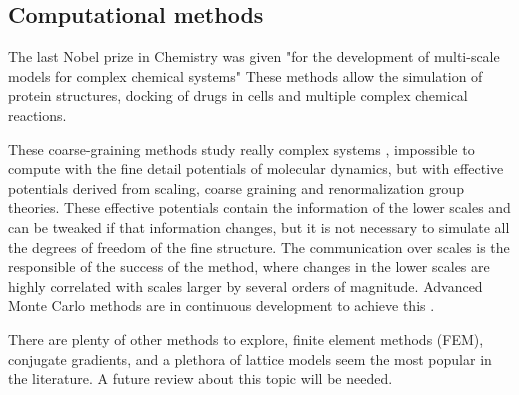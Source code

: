 \subsection{Computational methods}  
The last Nobel prize in Chemistry was given "for the development of multi-scale
models for complex chemical systems" \citep{nobel:chemistry2013} These methods
allow the simulation of protein structures,  docking of drugs in cells and
multiple complex chemical reactions.

These coarse-graining methods study really complex
systems \citep{de_pablo_coarse-grained_2011}, impossible to compute with  the
fine detail potentials of molecular dynamics, but with effective potentials 
derived from scaling, coarse graining and renormalization group theories. These
effective potentials contain the information of the lower scales and can be
tweaked if that information changes, but it is not necessary to simulate all the
degrees of freedom of the fine structure. The communication over scales is the
responsible of the success of the method, where changes in the lower scales are
highly correlated with scales larger by several orders of magnitude. Advanced
Monte Carlo methods are in continuous development to achieve this
\citep{karayiannis_novel_2002}.

There are plenty of other methods to explore, finite element methods (FEM),
conjugate gradients, and a plethora of lattice models seem the most popular in
the literature.  A future review about this topic will be needed.




